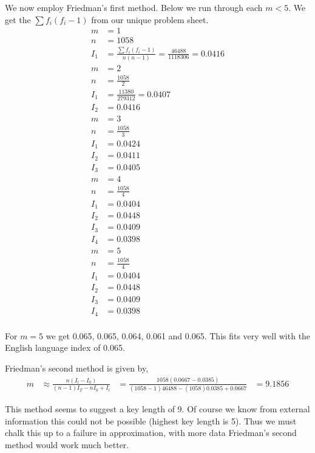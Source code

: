 \documentclass{article}
\begin{document}
We now employ Friedman's first method.
Below we run through each $m < 5$. We get the $\sum{f_i(f_i-1)}$ from our
unique problem sheet.
\begin{align*}
    m &= 1 \\
    n &= 1058 \\
    I_1 &= \frac{\sum{f_i(f_i-1)}}{n(n-1)} = \frac{46488}{1118306} = 0.0416 \\
    m &= 2 \\
    n &= \frac{1058}{2} \\
    I_1 &= \frac{11380}{279312} = 0.0407 \\
    I_2 &= 0.0416 \\
    m &= 3 \\
    n &= \frac{1058}{3} \\
    I_1 &= 0.0424 \\
    I_2 &= 0.0411 \\
    I_3 &= 0.0405 \\
    m &= 4 \\
    n &= \frac{1058}{4} \\
    I_1 &= 0.0404 \\
    I_2 &= 0.0448 \\
    I_3 &= 0.0409 \\
    I_4 &= 0.0398 \\
    m &= 5 \\
    n &= \frac{1058}{4} \\
    I_1 &= 0.0404 \\
    I_2 &= 0.0448 \\
    I_3 &= 0.0409 \\
    I_4 &= 0.0398 \\
\end{align*}

For $m=5$ we get 0.065, 0.065, 0.064, 0.061 and 0.065. This
fits very well with the English language index of 0.065.

Friedman's second method is given by,
\begin{align*}
    m &\approx \frac{n(I_l - I_0)}{(n-1)I_T - nI_0 + I_l}
    &= \frac{1058(0.0667 - 0.0385)}{(1058-1)46488 - (1058)0.0385 + 0.0667}
    &= 9.1856
\end{align*}

This method seems to suggest a key length of 9. Of course we know
from external information this could not be possible (highest key length is 5).
Thus we must chalk this up to a failure in approximation, with more data
Friedman's second method would work much better.
\end{document}
